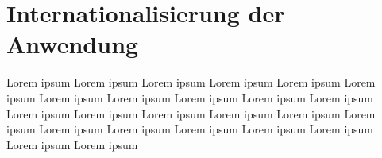 \section{Internationalisierung der Anwendung}
Lorem ipsum Lorem ipsum Lorem ipsum Lorem ipsum Lorem ipsum Lorem ipsum Lorem ipsum Lorem ipsum 
Lorem ipsum Lorem ipsum Lorem ipsum Lorem ipsum Lorem ipsum Lorem ipsum Lorem ipsum Lorem ipsum 
Lorem ipsum Lorem ipsum Lorem ipsum Lorem ipsum Lorem ipsum Lorem ipsum Lorem ipsum Lorem ipsum 